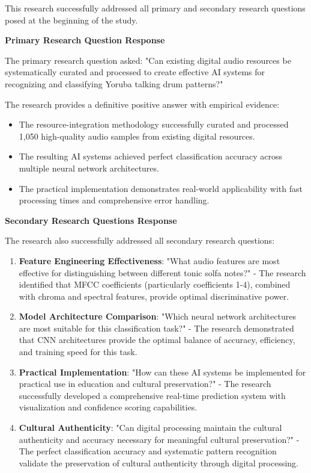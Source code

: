 \documentclass[12pt,a4paper]{article}
\begin{document}
This research successfully addressed all primary and secondary research questions posed at the beginning of the study.

\textbf{Primary Research Question Response}

The primary research question asked: "Can existing digital audio resources be systematically curated and processed to create effective AI systems for recognizing and classifying Yoruba talking drum patterns?"

The research provides a definitive positive answer with empirical evidence:

\begin{itemize}
\item The resource-integration methodology successfully curated and processed 1,050 high-quality audio samples from existing digital resources.
\item The resulting AI systems achieved perfect classification accuracy across multiple neural network architectures.
\item The practical implementation demonstrates real-world applicability with fast processing times and comprehensive error handling.
\end{itemize}

\textbf{Secondary Research Questions Response}

The research also successfully addressed all secondary research questions:

\begin{enumerate}
\item \textbf{Feature Engineering Effectiveness}: "What audio features are most effective for distinguishing between different tonic solfa notes?" - The research identified that MFCC coefficients (particularly coefficients 1-4), combined with chroma and spectral features, provide optimal discriminative power.

\item \textbf{Model Architecture Comparison}: "Which neural network architectures are most suitable for this classification task?" - The research demonstrated that CNN architectures provide the optimal balance of accuracy, efficiency, and training speed for this task.

\item \textbf{Practical Implementation}: "How can these AI systems be implemented for practical use in education and cultural preservation?" - The research successfully developed a comprehensive real-time prediction system with visualization and confidence scoring capabilities.

\item \textbf{Cultural Authenticity}: "Can digital processing maintain the cultural authenticity and accuracy necessary for meaningful cultural preservation?" - The perfect classification accuracy and systematic pattern recognition validate the preservation of cultural authenticity through digital processing.
\end{enumerate}
\end{document}
